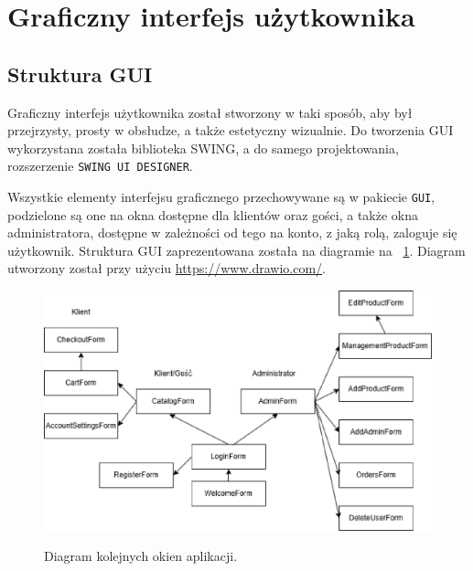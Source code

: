 
\section{Graficzny interfejs użytkownika}


\subsection{Struktura GUI}

Graficzny interfejs użytkownika został stworzony w taki sposób, aby był przejrzysty, prosty w obsłudze, a także estetyczny wizualnie.
Do tworzenia GUI wykorzystana została biblioteka SWING, a do samego projektowania, rozszerzenie \texttt{SWING UI DESIGNER}.

Wszystkie elementy interfejsu graficznego przechowywane są w pakiecie \texttt{GUI}, podzielone są one na okna dostępne dla klientów oraz gości, a także okna administratora, dostępne 
w zależności od tego na konto, z jaką rolą, zaloguje się użytkownik. Struktura GUI zaprezentowana została na diagramie na \figurename~\ref{fig5}. Diagram utworzony został przy użyciu \url{https://www.drawio.com/}.
\begin{figure}[H]
    \centering
    \includegraphics[width=\linewidth]{figures/fig_0005.eps}\\
    \caption{Diagram kolejnych okien aplikacji.\label{fig5}}
\end{figure}


